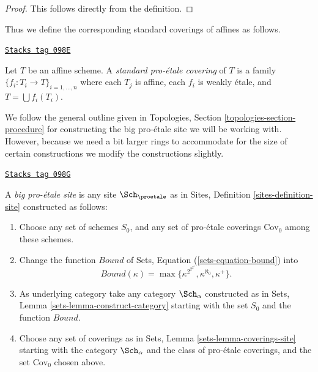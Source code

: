 \begin{proof}
This follows directly from the definition.
\end{proof}

Thus we define the corresponding standard coverings of affines as follows.

\begin{definition}
\label{proetale-definition-standard-proetale}
\href{https://stacks.math.columbia.edu/tag/098E}{\texttt{Stacks tag 098E}}

Let $T$ be an affine scheme. A {\it standard pro-\'etale covering}
of $T$ is a family $\{f_i : T_i \to T\}_{i = 1, \ldots, n}$
where each $T_j$ is affine, each $f_i$ is weakly \'etale, and
$T = \bigcup f_i(T_i)$.
\end{definition}

We follow the general outline given in
Topologies, Section \ref{topologies-section-procedure}
for constructing the big pro-\'etale site we will be working with.
However, because we need a bit larger rings to accommodate for the size
of certain constructions we modify the constructions slightly.

\begin{definition}
\label{proetale-definition-big-proetale-site}
\href{https://stacks.math.columbia.edu/tag/098G}{\texttt{Stacks tag 098G}}

A {\it big pro-\'etale site} is any site $\Sch_\proetale$ as in
Sites, Definition \ref{sites-definition-site} constructed as follows:
\begin{enumerate}
\item Choose any set of schemes $S_0$, and any set of pro-\'etale coverings
$\text{Cov}_0$ among these schemes.
\item Change the function $Bound$ of
Sets, Equation (\ref{sets-equation-bound}) into
$$
Bound(\kappa) = \max\{\kappa^{2^{2^{2^\kappa}}}, \kappa^{\aleph_0}, \kappa^+\}.
$$
\item As underlying category take any category $\Sch_\alpha$
constructed as in Sets, Lemma \ref{sets-lemma-construct-category}
starting with the set $S_0$ and the function $Bound$.
\item Choose any set of coverings as in
Sets, Lemma \ref{sets-lemma-coverings-site} starting with the
category $\Sch_\alpha$ and the class of pro-\'etale coverings,
and the set $\text{Cov}_0$ chosen above.
\end{enumerate}
\end{definition}

